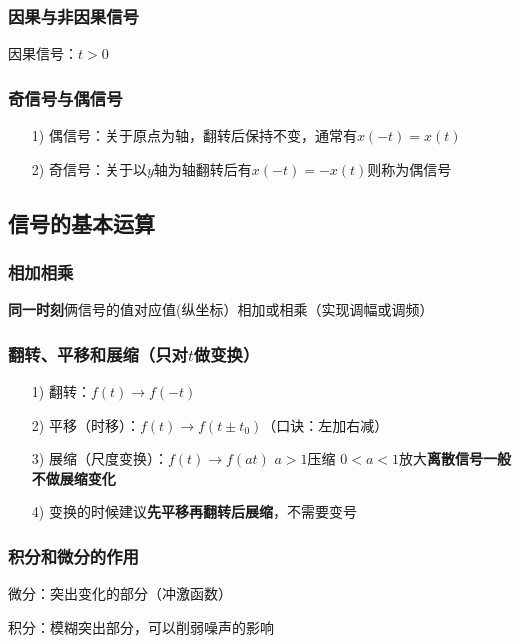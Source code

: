 \documentclass{ctexart}
\numberwithin{figure}{section}
\numberwithin{equation}{section}
\begin{document}
        \subsubsection{因果与非因果信号}
            因果信号：$t>0$
        \subsubsection{奇信号与偶信号}
            \begin{enumerate}
                \item[1)]   偶信号：关于原点为轴，翻转后保持不变，通常有$x(-t)=x(t)$
                \item[2)]   奇信号：关于以$y$轴为轴翻转后有$x(-t)=-x(t)$则称为偶信号 
            \end{enumerate}
    \subsection{信号的基本运算}
        \subsubsection{相加相乘}
            \textbf{同一时刻}俩信号的值对应值(纵坐标）相加或相乘（实现调幅或调频） 
        \subsubsection{翻转、平移和展缩（只对$t$做变换）}
            \begin{enumerate}
                \item[1)]翻转：$f(t)\rightarrow f(-t)$
                \item[2)]平移（时移）：$f(t) \rightarrow f(t\pm t_0)$（口诀：左加右减）
                \item[3)]展缩（尺度变换）：$f(t)\rightarrow f(at)$ 
                    \subitem $a>1$压缩
                    \subitem $0<a<1$放大\subitem \textbf{离散信号一般不做展缩变化}
                \item[4)]变换的时候建议\textbf{先平移再翻转后展缩}，不需要变号 
            \end{enumerate}
        \subsubsection{积分和微分的作用}
            微分：突出变化的部分（冲激函数）

            积分：模糊突出部分，可以削弱噪声的影响
\end{document}
